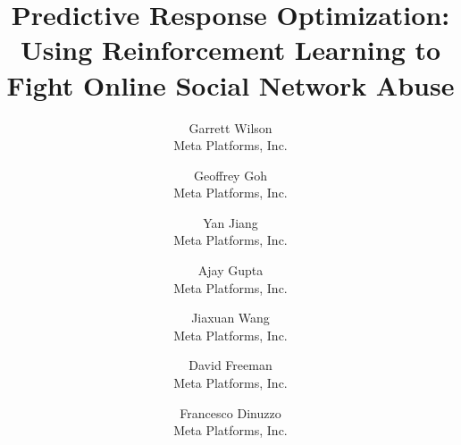 \documentclass[letterpaper,twocolumn,10pt]{article}
\begin{document}
\date{}

\title{Predictive Response Optimization: \\ Using Reinforcement Learning to Fight Online Social Network Abuse}

\author{
    {\rm Garrett Wilson}\\
    Meta Platforms, Inc.
    \and
    {\rm Geoffrey Goh}\\
    Meta Platforms, Inc.
    \and
    {\rm Yan Jiang}\\
    Meta Platforms, Inc.
    \and
    {\rm Ajay Gupta}\\
    Meta Platforms, Inc.
    \and
    {\rm Jiaxuan Wang}\\
    Meta Platforms, Inc.
    \and
    {\rm David Freeman}\\
    Meta Platforms, Inc.
    \and
    {\rm Francesco Dinuzzo}\\
    Meta Platforms, Inc.
}
\maketitle












\end{document}
